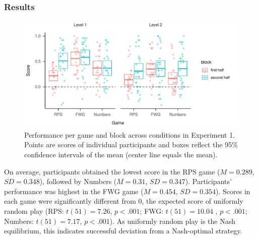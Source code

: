 \documentclass[man,floatsintext]{apa6}
\begin{document}
\hypertarget{results}{%
\subsubsection{Results}\label{results}}

\begin{figure}

{\centering \includegraphics{paper_draft_2021_files/figure-latex/exp1-avg-scores-game-1} 

}

\caption{Performance per game and block across conditions in Experiment 1. Points are scores of individual participants and boxes reflect the 95\% confidence intervals of the mean (center line equals the mean).}\label{fig:exp1-avg-scores-game}
\end{figure}

On average, participants obtained the lowest score in the RPS game (\(M = 0.289\), \(SD = 0.348\)), followed by Numbers (\(M = 0.31\), \(SD = 0.347\)). Participants' performance was highest in the FWG game (\(M = 0.454\), \(SD = 0.354\)). Scores in each game were significantly different from 0, the expected score of uniformly random play (RPS: \(t(51) = 7.26\), \(p < .001\); FWG: \(t(51) = 10.04\) , \(p < .001\); Numbers: \(t(51) = 7.17\), \(p < .001\)). As uniformly random play is the Nash equilibrium, this indicates successful deviation from a Nash-optimal strategy.
\end{document}
